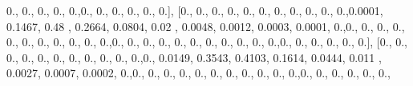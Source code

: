 \documentclass[
]{book}
\newenvironment{Shaded}{\begin{snugshade}}{\end{snugshade}}
\newcommand{\FloatTok}[1]{\textcolor[rgb]{0.00,0.00,0.81}{#1}}
\newcommand{\NormalTok}[1]{#1}
\begin{document}
\begin{Shaded}
\begin{Highlighting}[]
\FloatTok{0.}\NormalTok{, }\FloatTok{0.}\NormalTok{, }\FloatTok{0.}\NormalTok{, }\FloatTok{0.}\NormalTok{, }\FloatTok{0.}\NormalTok{,}\FloatTok{0.}\NormalTok{, }\FloatTok{0.}\NormalTok{, }\FloatTok{0.}\NormalTok{, }\FloatTok{0.}\NormalTok{, }\FloatTok{0.}\NormalTok{, }\FloatTok{0.}\NormalTok{], [}\FloatTok{0.}\NormalTok{, }\FloatTok{0.}\NormalTok{, }\FloatTok{0.}\NormalTok{, }\FloatTok{0.}\NormalTok{, }\FloatTok{0.}\NormalTok{, }\FloatTok{0.}\NormalTok{, }\FloatTok{0.}\NormalTok{, }\FloatTok{0.}\NormalTok{, }\FloatTok{0.}\NormalTok{,}
\FloatTok{0.}\NormalTok{, }\FloatTok{0.}\NormalTok{,}\FloatTok{0.0001}\NormalTok{, }\FloatTok{0.1467}\NormalTok{, }\FloatTok{0.48}\NormalTok{  , }\FloatTok{0.2664}\NormalTok{, }\FloatTok{0.0804}\NormalTok{, }\FloatTok{0.02}\NormalTok{  , }\FloatTok{0.0048}\NormalTok{, }\FloatTok{0.0012}\NormalTok{, }\FloatTok{0.0003}\NormalTok{,}
\FloatTok{0.0001}\NormalTok{, }\FloatTok{0.}\NormalTok{,}\FloatTok{0.}\NormalTok{, }\FloatTok{0.}\NormalTok{, }\FloatTok{0.}\NormalTok{, }\FloatTok{0.}\NormalTok{, }\FloatTok{0.}\NormalTok{, }\FloatTok{0.}\NormalTok{, }\FloatTok{0.}\NormalTok{, }\FloatTok{0.}\NormalTok{, }\FloatTok{0.}\NormalTok{, }\FloatTok{0.}\NormalTok{, }\FloatTok{0.}\NormalTok{,}\FloatTok{0.}\NormalTok{, }\FloatTok{0.}\NormalTok{, }\FloatTok{0.}\NormalTok{, }\FloatTok{0.}\NormalTok{, }\FloatTok{0.}\NormalTok{, }\FloatTok{0.}\NormalTok{,}
\FloatTok{0.}\NormalTok{, }\FloatTok{0.}\NormalTok{, }\FloatTok{0.}\NormalTok{, }\FloatTok{0.}\NormalTok{, }\FloatTok{0.}\NormalTok{,}\FloatTok{0.}\NormalTok{, }\FloatTok{0.}\NormalTok{, }\FloatTok{0.}\NormalTok{, }\FloatTok{0.}\NormalTok{, }\FloatTok{0.}\NormalTok{, }\FloatTok{0.}\NormalTok{], [}\FloatTok{0.}\NormalTok{, }\FloatTok{0.}\NormalTok{, }\FloatTok{0.}\NormalTok{, }\FloatTok{0.}\NormalTok{, }\FloatTok{0.}\NormalTok{, }\FloatTok{0.}\NormalTok{, }\FloatTok{0.}\NormalTok{, }\FloatTok{0.}\NormalTok{, }\FloatTok{0.}\NormalTok{,}
\FloatTok{0.}\NormalTok{, }\FloatTok{0.}\NormalTok{,}\FloatTok{0.}\NormalTok{, }\FloatTok{0.0149}\NormalTok{, }\FloatTok{0.3543}\NormalTok{, }\FloatTok{0.4103}\NormalTok{, }\FloatTok{0.1614}\NormalTok{, }\FloatTok{0.0444}\NormalTok{, }\FloatTok{0.011}\NormalTok{ , }\FloatTok{0.0027}\NormalTok{, }\FloatTok{0.0007}\NormalTok{,}
\FloatTok{0.0002}\NormalTok{, }\FloatTok{0.}\NormalTok{,}\FloatTok{0.}\NormalTok{, }\FloatTok{0.}\NormalTok{, }\FloatTok{0.}\NormalTok{, }\FloatTok{0.}\NormalTok{, }\FloatTok{0.}\NormalTok{, }\FloatTok{0.}\NormalTok{, }\FloatTok{0.}\NormalTok{, }\FloatTok{0.}\NormalTok{, }\FloatTok{0.}\NormalTok{, }\FloatTok{0.}\NormalTok{, }\FloatTok{0.}\NormalTok{,}\FloatTok{0.}\NormalTok{, }\FloatTok{0.}\NormalTok{, }\FloatTok{0.}\NormalTok{, }\FloatTok{0.}\NormalTok{, }\FloatTok{0.}\NormalTok{, }\FloatTok{0.}\NormalTok{,}

\end{Highlighting}
\end{Shaded}
\end{document}
